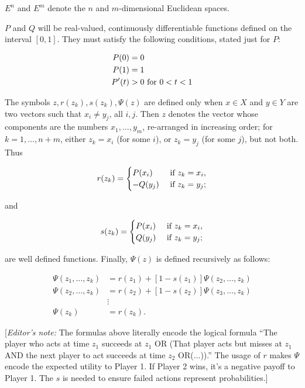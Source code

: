 \documentclass{article}
\theoremstyle{remark}
\begin{document}
$E^n$ and $E^m$ denote the $n$ and $m$-dimensional Euclidean spaces.

$P$ and $Q$ will be real-valued, continuously differentiable functions
defined on the interval $[0,1]$. They must satisfy the following conditions,
stated just for $P$:

\[
\begin{aligned}
P(0) &= 0 \\ P(1) &= 1 \\ P'(t) &> 0 \textup{ for } 0 < t < 1
\end{aligned}
\]

The symbols $z, r(z_k), s(z_k), \Psi(z)$ are defined only when $x \in X$ and
$y \in Y$ are two vectors such that $x_i \neq y_j$, all $i, j$. Then $z$
denotes the vector whose components are the numbers $x_1, \dots, y_m$,
re-arranged in increasing order; for $k = 1, \dots, n+m$, either $z_k = x_i$
(for some $i$), or $z_k = y_j$ (for some $j$), but not both. Thus

\[
r(z_k) = \begin{cases}
P(x_i) & \textup{ if } z_k = x_i, \\
-Q(y_j) & \textup{ if } z_k = y_j;
\end{cases}
\]

and

\[
s(z_k) = \begin{cases}
P(x_i) & \textup{ if } z_k = x_i, \\
Q(y_j) & \textup{ if } z_k = y_j;
\end{cases}
\]

are well defined functions. Finally, $\Psi(z)$ is defined recursively as
follows:

\[
\begin{aligned}
\Psi(z_1, \dots, z_k) &= r(z_1) + [1 - s(z_1)] \Psi(z_2, \dots, z_k) \\
\Psi(z_2, \dots, z_k) &= r(z_2) + [1 - s(z_2)] \Psi(z_3, \dots, z_k) \\
& \vdots \\
\Psi(z_k) &= r(z_k).
\end{aligned}
\]

[\emph{Editor's note:} The formulas above literally encode the logical formula
``The player who acts at time $z_1$ succeeds at $z_1$ OR (That player acts but
misses at $z_1$ AND the next player to act succeeds at time $z_2$
OR($\dots$)).'' The usage of $r$ makes $\Psi$ encode the expected utility to
Player 1. If Player 2 wins, it's a negative payoff to Player 1. The $s$ is
needed to ensure failed actions represent probabilities.]
\end{document}
